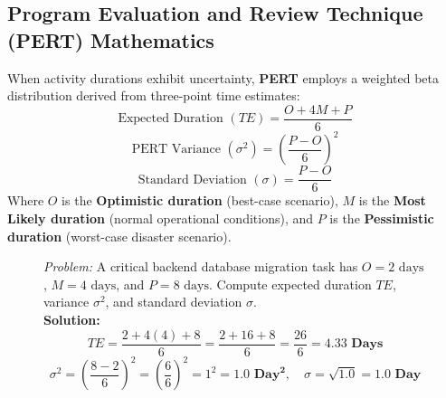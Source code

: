 \subsection{Program Evaluation and Review Technique (PERT) Mathematics}
When activity durations exhibit uncertainty, \textbf{PERT} employs a weighted beta distribution derived from three-point time estimates:
\begin{equation}
\boxed{\text{Expected Duration } (TE) = \frac{O + 4M + P}{6}}
\end{equation}
\begin{equation}
\boxed{\text{PERT Variance } (\sigma^2) = \left(\frac{P - O}{6}\right)^2}
\end{equation}
\begin{equation}
\boxed{\text{Standard Deviation } (\sigma) = \frac{P - O}{6}}
\end{equation}
Where $O$ is the \textbf{Optimistic duration} (best-case scenario), $M$ is the \textbf{Most Likely duration} (normal operational conditions), and $P$ is the \textbf{Pessimistic duration} (worst-case disaster scenario).
\begin{figure}[htbp]
\centering
\begin{tcolorbox}[colback=codebg, colframe=primary, title=\textbf{Worked Example: PERT Expected Duration and Variance}]
\textit{Problem:} A critical backend database migration task has $O = 2\text{ days}$, $M = 4\text{ days}$, and $P = 8\text{ days}$. Compute expected duration $TE$, variance $\sigma^2$, and standard deviation $\sigma$. \\
\textbf{Solution:}
\[
TE = \frac{2 + 4(4) + 8}{6} = \frac{2 + 16 + 8}{6} = \frac{26}{6} = \mathbf{4.33\text{ Days}}
\]
\[
\sigma^2 = \left(\frac{8 - 2}{6}\right)^2 = \left(\frac{6}{6}\right)^2 = 1^2 = \mathbf{1.0\text{ Day}^2}, \quad \sigma = \sqrt{1.0} = \mathbf{1.0\text{ Day}}
\]
\end{tcolorbox}
\end{figure}

